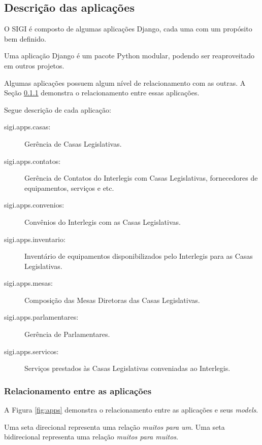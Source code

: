 \subsection{Descrição das aplicações}
\label{sec:apps}
O SIGI é composto de algumas aplicações Django, cada uma com um
propósito bem definido.

Uma aplicação Django é um pacote Python modular, podendo ser
reaproveitado em outros projetos.

Algumas aplicações possuem algum nível de relacionamento com as
outras. A Seção \ref{sec:rel} demonstra o relacionamento entre essas
aplicações.

Segue descrição de cada aplicação:

\begin{description}
\item[sigi.apps.casas:]
  Gerência de Casas Legislativas.

\item[sigi.apps.contatos:]
  Gerência de Contatos do Interlegis com Casas Legislativas,
  fornecedores de equipamentos, serviços e etc.

\item[sigi.apps.convenios:]
  Convênios do Interlegis com as Casas Legislativas.

\item[sigi.apps.inventario:]
  Inventário de equipamentos disponibilizados pelo Interlegis para as
  Casas Legislativas.

\item[sigi.apps.mesas:]
  Composição das Mesas Diretoras das Casas Legislativas.

\item[sigi.apps.parlamentares:]
  Gerência de Parlamentares.

\item[sigi.apps.servicos:]
  Serviços prestados às Casas Legislativas conveniadas ao Interlegis.
\end{description}

\subsubsection{Relacionamento entre as aplicações}
\label{sec:rel}

A Figura \ref{fig:apps} demonstra o relacionamento entre as
aplicações e seus \emph{models}.

Uma seta direcional representa uma relação \textit{muitos para
  um}. Uma seta bidirecional representa uma relação \textit{muitos
  para muitos}.

